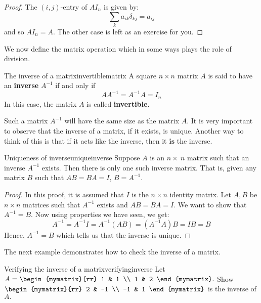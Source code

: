 \begin{proof}
The $(i,j)$-entry of $AI_n$ is given by:
\begin{equation*}
\sum_{k}a_{ik}\delta _{kj}=a_{ij}
\end{equation*}
and so $AI_{n}=A.$ The other case is left as an exercise for you. 
\end{proof}

We now define the matrix operation which in some ways plays the role of division. 

\begin{definition}{The inverse of a matrix}{invertiblematrix}
A square  $n\times n$ matrix $A$ is said to have an \textbf{inverse} $A^{-1}$
if and only if 
\begin{equation*}
AA^{-1}=A^{-1}A=I_n
\end{equation*}
In this case, the matrix $A$ is called
 \textbf{invertible}.
\end{definition}

Such a  matrix $A^{-1}$ will have the same size as the matrix $A$. 
It is very important to observe that the inverse of a matrix, if it exists,
is unique. Another way to think of this is that if it acts like the inverse,
then it $\textbf{is}$ the inverse.

\begin{theorem}{Uniqueness of inverse}{uniqueinverse}
Suppose $A$ is an $n \times\ n$ matrix such that an inverse  $A^{-1}$ exists. Then there is only one such 
inverse matrix. 
That is, given any matrix $B$ such that $AB=BA=I$, $B=A^{-1}$.
\end{theorem}

\begin{proof} In this proof, it is assumed that $I$ is the $n \times n$ identity matrix. 
Let $A, B$ be $n \times n$ matrices such that $A^{-1}$ exists and $AB=BA=I$. 
We want to show that $A^{-1} = B$. 
Now using properties we have seen, we get: 
\begin{equation*}
A^{-1}=A^{-1}I=A^{-1}\left( AB\right) =\left( A^{-1}A\right) B=IB=B
\end{equation*}
Hence, $A^{-1} = B$ which tells us that the inverse is unique.
\end{proof}

The next example demonstrates how to check the inverse of a matrix. 

\begin{example}{Verifying the inverse of a matrix}{verifyinginverse}
Let $A=\begin{mymatrix}{rr}
1 & 1 \\
1 & 2
\end{mymatrix} .$ Show $\begin{mymatrix}{rr}
2 & -1 \\
-1 & 1
\end{mymatrix} $ is the inverse of $A.$
\end{example}

